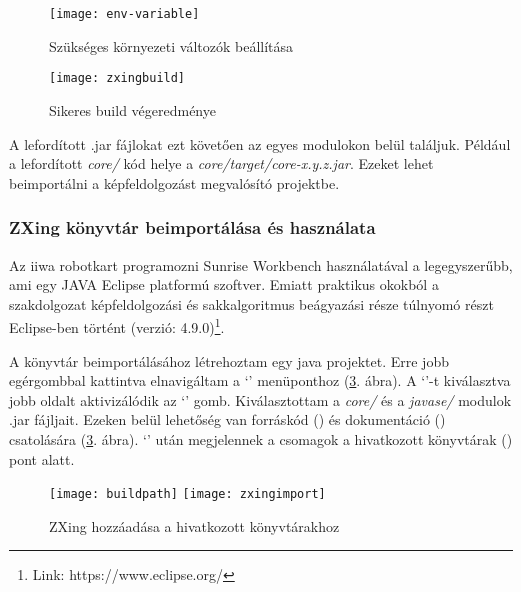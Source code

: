 \documentclass[../documentation.tex]{subfiles}
\begin{document}
\begin{figure}[h]
\centering
\texttt{[image: env-variable]}
\caption{Szükséges környezeti változók beállítása}
\label{fig:envvar}
\end{figure}

\begin{figure}[h]
\centering
\texttt{[image: zxingbuild]}
\caption{Sikeres build végeredménye}
\label{fig:buildsuccess}
\end{figure}

A lefordított .jar fájlokat ezt követően az egyes modulokon belül találjuk. Például a lefordított \textit{core/} kód helye a \textit{core/target/core-x.y.z.jar}. Ezeket lehet beimportálni a képfeldolgozást megvalósító projektbe.

\subsubsection{ZXing könyvtár beimportálása és használata}
Az iiwa robotkart programozni Sunrise Workbench használatával a legegyszerűbb, ami egy JAVA Eclipse platformú szoftver. Emiatt praktikus okokból a szakdolgozat képfeldolgozási és sakkalgoritmus beágyazási része túlnyomó részt Eclipse-ben történt (verzió: 4.9.0)\footnote{Link: https://www.eclipse.org/}.

A könyvtár beimportálásához létrehoztam egy java projektet. Erre jobb egérgombbal kattintva elnavigáltam a `' menüponthoz (\ref{fig:zxingimport}. ábra). A `'-t kiválasztva jobb oldalt aktivizálódik az `' gomb. Kiválasztottam a \textit{core/} és a \textit{javase/} modulok .jar fájljait. Ezeken belül lehetőség van forráskód () és dokumentáció () csatolására (\ref{fig:zxingimport}. ábra). `' után megjelennek a csomagok a hivatkozott könyvtárak () pont alatt.

\begin{figure}[h]
\centering
\texttt{[image: buildpath]}
\texttt{[image: zxingimport]}
\caption{ZXing hozzáadása a hivatkozott könyvtárakhoz}
\label{fig:zxingimport}
\end{figure}
\end{document}
